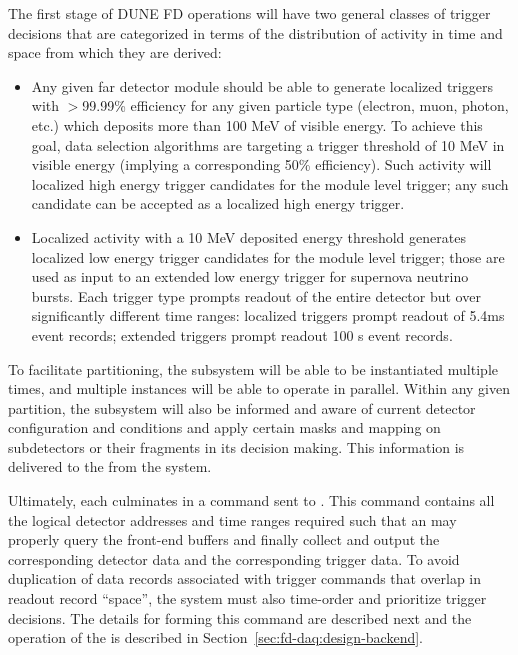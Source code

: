 The first stage of DUNE FD operations will have two general classes of trigger
decisions that are categorized in terms of the distribution of activity
in time and space from which they are derived: 
\begin{itemize}
\item Any given far detector module should be able to generate
  localized triggers with $>$99.99\% efficiency for any given particle
  type (electron, muon, photon, etc.) 
  which deposits more than 100 MeV of visible energy. To achieve this
  goal, data selection algorithms are targeting a trigger threshold of
  10 MeV in visible energy (implying a corresponding 50\%
  efficiency). Such activity will localized high energy trigger candidates for
    the module level trigger; any such candidate can be accepted as a localized high energy trigger.
\item    Localized activity with a 10 MeV deposited energy threshold
    generates localized low energy trigger candidates for the module
    level trigger; those are used as input to an extended low energy trigger
    for supernova neutrino bursts. Each trigger type prompts readout
    of the entire detector but over significantly different time
    ranges: localized triggers prompt readout of 5.4\si{\milli\second} event records; extended
    triggers prompt readout 100 s event records. 
\end{itemize}

To facilitate partitioning, the  subsystem will be
able to be instantiated multiple times, and multiple instances will be
able to operate in parallel. Within any
given partition, the  subsystem will also be
informed and aware of current detector configuration and conditions and
apply certain masks and mapping on subdetectors or their fragments in
its decision making. This information is delivered to the
 from the  system.

Ultimately, each  culminates in a command sent to . 
This command contains all the logical detector addresses and time ranges
required such that an  may properly query the front-end
buffers and finally collect and output the corresponding detector data
and the corresponding trigger data. To avoid duplication of data
records associated with trigger commands that overlap in readout
record ``space'', the  system must also time-order and
prioritize trigger decisions. The details for forming this
command are described next and the operation of the  is
described in Section~\ref{sec:fd-daq:design-backend}.

